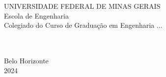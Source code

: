 
\begin{titlepage}

    \begin{center}
        \begin{spacing}{1}
            UNIVERSIDADE FEDERAL DE MINAS GERAIS \\
            Escola de Engenharia \\
            Colegiado do Curso de Graduação em Engenharia ... \\ %
        \end{spacing}
        \vspace{5cm}
        \theauthor \\
        \vspace{5cm}
        \textbf{\MakeUppercase\thetitle}\\ %
        \vspace*{\fill}
        Belo Horizonte\\2024
    \end{center}

\end{titlepage}